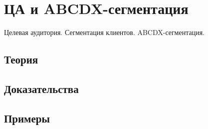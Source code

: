 
\section{ЦА и ABCDX-сегментация}
\label{sec:2.6.01-target-audience}

\begin{ticket}
Целевая аудитория. Сегментация клиентов. ABCDX-сегментация.
\end{ticket}

\subsection*{Теория}

\subsection*{Доказательства}

\subsection*{Примеры}
